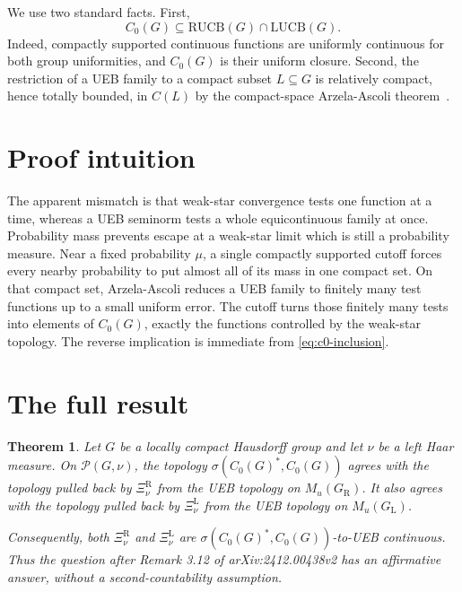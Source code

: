 \documentclass[11pt]{article}
\newtheorem{theorem}{Theorem}
\newcommand{\Prob}{\mathcal P}
\newcommand{\Meanu}{M_{\!u}}
\newcommand{\RUCB}{\mathrm{RUCB}}
\newcommand{\LUCB}{\mathrm{LUCB}}
\begin{document}
We use two standard facts.  First,
\begin{equation}\label{eq:c0-inclusion}
  C_0(G)\subseteq \RUCB(G)\cap\LUCB(G).
\end{equation}
Indeed, compactly supported continuous functions are uniformly continuous
for both group uniformities, and $C_0(G)$ is their uniform closure.  Second,
the restriction of a UEB family to a compact subset $L\subseteq G$ is
relatively compact, hence totally bounded, in $C(L)$ by the compact-space
Arzela-Ascoli theorem~\cite{ascoli}.

\section{Proof intuition}

The apparent mismatch is that weak-star convergence tests one function at a
time, whereas a UEB seminorm tests a whole equicontinuous family at once.
Probability mass prevents escape at a weak-star limit which is still a
probability measure.  Near a fixed probability $\mu$, a single compactly
supported cutoff forces every nearby probability to put almost all of its
mass in one compact set.  On that compact set, Arzela-Ascoli reduces a UEB
family to finitely many test functions up to a small uniform error.  The
cutoff turns those finitely many tests into elements of $C_0(G)$, exactly the
functions controlled by the weak-star topology.  The reverse implication is
immediate from \eqref{eq:c0-inclusion}.

\section{The full result}

\begin{theorem}\label{thm:main}
Let $G$ be a locally compact Hausdorff group and let $\nu$ be a left Haar
measure.  On $\Prob(G,\nu)$, the topology
$\sigma(C_0(G)^*,C_0(G))$ agrees with the topology pulled back by
$\Xi_\nu^{\mathrm R}$ from the UEB topology on $\Meanu(G_{\mathrm R})$.
It also agrees with the topology pulled back by $\Xi_\nu^{\mathrm L}$ from
the UEB topology on $\Meanu(G_{\mathrm L})$.

Consequently, both $\Xi_\nu^{\mathrm R}$ and $\Xi_\nu^{\mathrm L}$ are
$\sigma(C_0(G)^*,C_0(G))$-to-UEB continuous.  Thus the question after
Remark 3.12 of arXiv:2412.00438v2 has an affirmative answer, without a
second-countability assumption.
\end{theorem}
\end{document}
